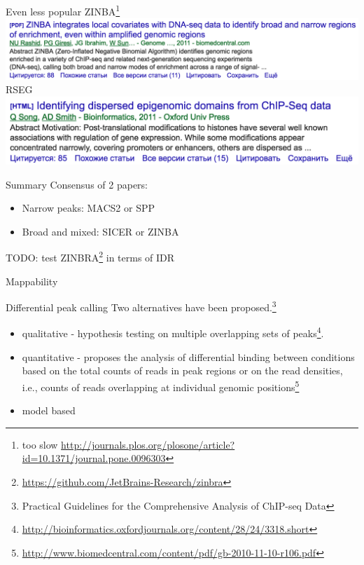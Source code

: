 \documentclass{beamer}
\begin{document}
\begin{frame}{Even less popular}
ZINBA\footnote{too slow \url{http://journals.plos.org/plosone/article?id=10.1371/journal.pone.0096303}}\\
\includegraphics[width=\linewidth]{ZINBA.png}\\
RSEG\\
\includegraphics[width=\linewidth]{RSEG.png}\\
\end{frame}

\begin{frame}{Summary}
Consensus of 2 papers:
\begin{itemize}
\item Narrow peaks: MACS2 or SPP
\item Broad and mixed: SICER or ZINBA
\end{itemize}
TODO: test ZINBRA\footnote{\url{https://github.com/JetBrains-Research/zinbra}} in terms of IDR
\end{frame}

\begin{frame}{Mappability}


\end{frame}



\begin{frame}{Differential peak calling}
Two alternatives have been proposed.\footnote{Practical Guidelines for the Comprehensive Analysis of ChIP-seq Data}
\begin{itemize}
\item qualitative - hypothesis testing on multiple overlapping sets of peaks\footnote{\url{http://bioinformatics.oxfordjournals.org/content/28/24/3318.short}}.
\item quantitative -  proposes the analysis of differential binding between conditions based on the total counts of reads in peak regions or on the read densities, i.e., counts of reads overlapping at individual genomic positions\footnote{\url{http://www.biomedcentral.com/content/pdf/gb-2010-11-10-r106.pdf}}
\item model based
\end{itemize}
\end{frame}
\end{document}
